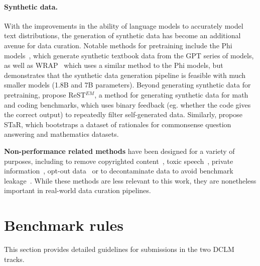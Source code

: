 \documentclass{article}
\newcommand{\dclm}{\textsc{DCLM}\xspace}
\begin{document}
\paragraph{Synthetic data.}
With the improvements in the ability of language models to accurately model text distributions, the generation of synthetic data has become an additional avenue for data curation. Notable methods for pretraining include the Phi models~\citep{gunasekar2023textbooks, abdin2024phi}, which generate synthetic textbook data from the GPT series of models, as well as WRAP~\citep{maini2024rephrasing} which uses a similar method to the Phi models, but demonstrates that the synthetic data generation pipeline is feasible with much smaller models (1.8B and 7B parameters).
Beyond generating synthetic data for pretraining, \citet{singh2024beyond} propose ReST$^{EM}$, a method for generating synthetic data for math and coding benchmarks, which uses binary feedback (eg. whether the code gives the correct output) to repeatedly filter self-generated data. Similarly, \citet{zelikman2022star} propose STaR, which bootstraps a dataset of rationales for commonsense question answering and mathematics datasets.

\textbf{Non-performance related methods} have been designed for a variety of purposes, including to remove copyrighted content~\citep{longpre2023data,shi2023detecting,shilov2024mosaic}, toxic speech~\citep{raffel2020exploring,ustun2024aya}, private information~\citep{allal2023santacoder,lozhkov2024starcoder}, opt-out data~\citep{lozhkov2024starcoder,muennighoff2023octopack} or to decontaminate data to avoid benchmark leakage~\citep{yang2023rethinking}. While these methods are less relevant to this work, they are nonetheless important in real-world data curation pipelines.

\section{Benchmark rules}\label{appx:benchmark-rules}
This section provides detailed guidelines for submissions  in the two \dclm tracks.
\end{document}
